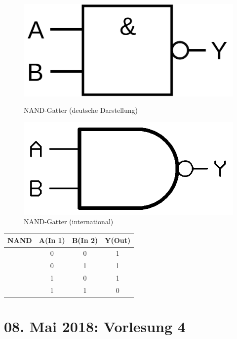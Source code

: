 \documentclass[12pt,a4paper]{report}%
\numberwithin{equation}{section}
\numberwithin{equation}{subsection}
\begin{document}
  \begin{figure}[H] 
		\centering
		\begin{minipage}{.5\textwidth}
		  \centering
		  \captionsetup{justification=centering}
		  \includegraphics[width=0.6\linewidth]{NAND.png}
		  \caption{NAND-Gatter (deutsche Darstellung)}
		  \label{fig:nand_de}
		\end{minipage}%
		\begin{minipage}{.5\textwidth}
		  \centering
		  \captionsetup{justification=centering}
		  \includegraphics[width=0.6\linewidth]{NAND_int.png}
		  \caption{NAND-Gatter (international)}
		  \label{fig:nand_int}
		\end{minipage}
  \end{figure}
  \begin{table}[H]
	  \centering
	  \begin{tabular}{c | c c c} 
	    NAND & A(In 1) & B(In 2) & Y(Out) \\ \hline
	    $\;$& 0       & 0       & 1 \\   
	    $\;$& 0       & 1       & 1 \\   
	    $\;$& 1       & 0       & 1 \\   
	    $\;$& 1       & 1       & 0 \\   \hline
	  \end{tabular}
  \end{table}
\newpage

	\section{08. Mai 2018: Vorlesung 4}
\end{document}
